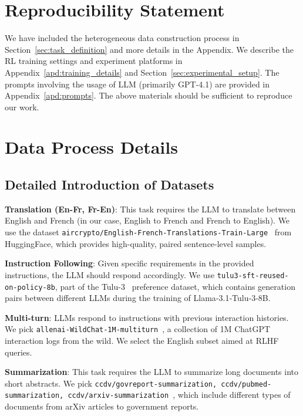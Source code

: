 

\section{Reproducibility Statement}

We have included the heterogeneous data construction process in Section~\ref{sec:task_definition} and more details in the Appendix. We describe the RL training settings and experiment platforms in Appendix~\ref{apd:training_details} and Section~\ref{sec:experimental_setup}. The prompts involving the usage of LLM (primarily GPT-4.1) are provided in Appendix~\ref{apd:prompts}. The above materials should be sufficient to reproduce our work.



\section{Data Process Details} \label{apd:data}

\subsection{Detailed Introduction of Datasets}
\noindent\textbf{Translation (En-Fr, Fr-En)}: This task requires the LLM to translate between English and French (in our case, English to French and French to English). We use the dataset \texttt{aircrypto/English-French-Translations-Train-Large}~\citep{hf_enfr} from HuggingFace, which provides high-quality, paired sentence-level samples.

\noindent\textbf{Instruction Following}: Given specific requirements in the provided instructions, the LLM should respond accordingly. We use \texttt{tulu3-sft-reused-on-policy-8b}, part of the Tulu-3~\citep{tulu3} preference dataset, which contains generation pairs between different LLMs during the training of Llama‑3.1‑Tulu‑3‑8B.

\noindent\textbf{Multi-turn}: LLMs respond to instructions with previous interaction histories. We pick \texttt{allenai-WildChat-1M-multiturn}~\citep{allenwilde}, a collection of 1M ChatGPT interaction logs from the wild. We select the English subset aimed at RLHF queries. 

\noindent\textbf{Summarization}: This task requires the LLM to summarize long documents into short abstracts. We pick \texttt{ccdv/govreport-summarization, ccdv/pubmed-summarization, ccdv/arxiv-summarization}~\citep{cohan-etal-2018-discourse-summarizationdataset}, which include different types of documents from arXiv articles to government reports.

